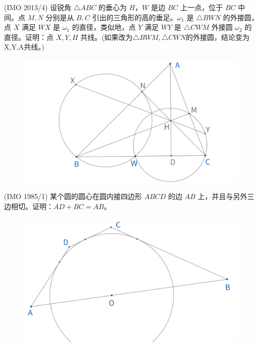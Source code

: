 \newpage 
\begin{exercise}
(IMO 2013/4) 设锐角 $\triangle ABC$ 的垂心为 $H$，$W$ 是边 $BC$ 上一点，位于 $BC$ 中间。点 $M, N$ 分别是从 $B, C$ 引出的三角形的高的垂足。$\omega_1$ 是 $\triangle BWN$ 的外接圆，点 $X$ 满足 $WX$ 是 $\omega_1$ 的直径，类似地，点 $Y$ 满足 $WY$ 是 $\triangle CWM$ 外接圆 $\omega_2$ 的直径。证明：点 $X, Y, H$ 共线。(如果改为$\triangle BWM, \triangle CWN$的外接圆，结论变为X,Y,A共线。)
\end{exercise}
\begin{figure}[H]
    \centering
    \includegraphics[width=0.7\linewidth]{figures/exercises/015.png}
\end{figure}


\begin{exercise}
(IMO 1985/1) 某个圆的圆心在圆内接四边形 $ABCD$ 的边 ${AB}$ 上，并且与另外三边相切。证明：$AD + BC = AB$。
\end{exercise}
\begin{figure}[H]
    \centering
    \includegraphics[width=0.7\linewidth]{figures/exercises/016.png}
\end{figure}